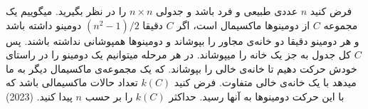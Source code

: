 فرض کنید $n$ عددی طبیعی و فرد باشد و جدولی $n \times n$ را در نظر بگیرید.
میگوییم یک مجموعه‌ $C$ از دومینوها ماکسیمال است، اگر $C$ دقیقا $(n^2 - 1)/2$ دومینو داشته باشد و 
هر دومینو دقیقا دو خانه‌ی مجاور را بپوشاند و دومینوها همپوشانی نداشته باشند. 
پس $C$ کل جدول به جز یک خانه را میپوشاند. 
در هر مرحله میتوانیم یک دومینو را در راستای خودش حرکت دهیم تا خانه‌ی خالی را بپوشاند. 
که یک مجموعه‌ی ماکسیمال دیگر به ما میدهد با یک خانه‌ی خالی متفاوت.
فرض کنید $k(C)$ تعداد حالات ماکسیمالی باشد که با این حرکت دومینوها به آنها رسید. 
حداکثر $k(C)$ را بر حسب $n$ پیدا کنید.
(2023)